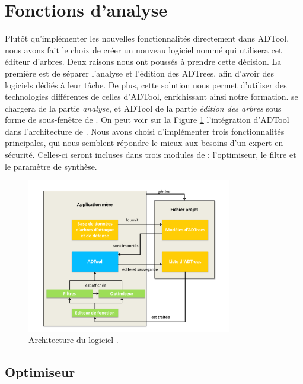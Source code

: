 \section{Fonctions d'analyse}

	Plutôt qu'implémenter les nouvelles fonctionnalités directement dans ADTool, nous avons fait le choix de créer un nouveau logiciel nommé \glasir{} qui utilisera cet éditeur d'arbres. Deux raisons nous ont poussés à prendre cette décision. La première est de séparer l'analyse et l'édition des ADTrees, afin d'avoir des logiciels dédiés à leur tâche. De plus, cette solution nous permet d'utiliser des technologies différentes de celles d'ADTool, enrichissant ainsi notre formation. \glasir{} se chargera de la partie \textit{analyse}, et ADTool de la partie \textit{édition des arbres} sous forme de sous-fenêtre de \glasir{}. On peut voir sur la {\sc Figure} \ref{fig:architecture_Glasir} l'intégration d'ADTool dans l'architecture de \glasir. Nous avons choisi d'implémenter trois fonctionnalités principales, qui nous semblent répondre le mieux aux besoins d'un expert en sécurité. Celles-ci seront incluses dans trois modules de \glasir{} : l'optimiseur, le filtre et le paramètre de synthèse. 

	\begin{figure}[h!]
		\centering
			\includegraphics[width=0.8\textwidth]{figure/archiGlasir.pdf}
		\caption{Architecture du logiciel \glasir.}
		\label{fig:architecture_Glasir}
	\end{figure}

	\subsection{Optimiseur}
		\label{subsection:optimiseur}

